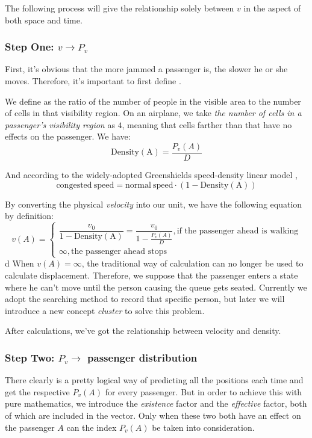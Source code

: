 \documentclass{article}
\begin{document}
	The following process will give the relationship solely between \(v\) in the aspect of both space and time.
	\subsubsection{Step One: \(v\to P_v\)}
	First, it's obvious that the more jammed a passenger is, the slower he or she moves. Therefore, it's important to first define .

	We define  as the ratio of the number of people in the visible area to the number of cells in that visibility region. On an airplane, we take \textit{the number of cells in a passenger's visibility region} as \(4\), meaning that cells farther than that have no effects on the passenger. We have:
	\[\mathrm{Density\left(A\right)} = \dfrac{P_v\left(A\right)}{D}\]

	And according to the widely-adopted Greenshields speed-density linear model \cite{greenshields}, \[\mathrm{congested\:speed} = \mathrm{normal\:speed}\cdot\left(1-\mathrm{Density\left(A\right)}\right)\]

	By converting the physical \textit{velocity} into our unit, we have the following equation by definition:
	\[v(A)=\begin{cases}\dfrac{v_0}{1-\mathrm{Density\left(A\right)}}=\dfrac{v_0}{1-\frac{P_v\left(A\right)}{D}}, \text{if the passenger ahead is walking}\\\infty, \text{the passenger ahead stops}\end{cases}\]
d
	When \(v\left(A\right)=\infty\), the traditional way of calculation can no longer be used to calculate displacement. Therefore, we suppose that the passenger enters a state where he can't move until the person causing the queue gets seated. Currently we adopt the searching method to record that specific person, but later we will introduce a new concept \textit{cluster} to solve this problem.

	After calculations, we've got the relationship between velocity and density.
	\subsubsection{Step Two: \(P_v\to \) passenger distribution}
	There clearly is a pretty logical way of predicting all the positions each time and get the respective \(P_v\left(A\right)\) for every passenger. But in order to achieve this with pure mathematics, we introduce the \textit{existence} factor and the \textit{effective} factor, both of which are included in the vector. Only when these two both have an effect on the passenger \(A\) can the index \(P_v\left(A\right)\) be taken into consideration.
\end{document}
